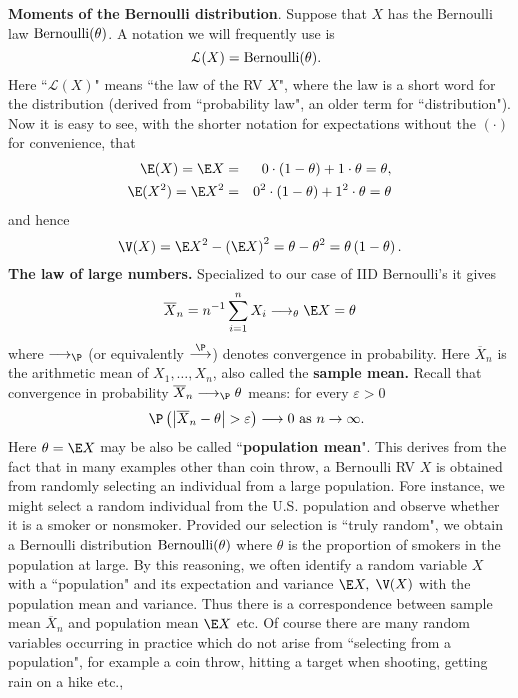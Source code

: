 \textbf{Moments of the Bernoulli distribution}. Suppose that $X$ has the
Bernoulli law $\mbox{{\rm Bernoulli}}(\theta)$. A notation we will frequently use is 
\begin{equation*}
\mathcal{L}(X)=\mbox{{\rm Bernoulli}}(\theta)\text{. }
\end{equation*}%
Here ``$\mathcal{L}(X)$" means ``the law of the RV $X$", where the law is
a short word for the distribution (derived from ``probability law", an older
term for ``distribution"). Now it is easy to see, with the shorter notation for expectations without the $(\cdot)$ for convenience, that 
\begin{eqnarray*}
\E (X) = \E X &=&0\cdot \left( 1-\theta\right) +1\cdot \theta=\theta, \\
\E (X^2) = \E X^{2} &=&0^{2}\cdot \left( 1-\theta\right) +1^{2}\cdot \theta=\theta
\end{eqnarray*}%
and hence 
\begin{equation*}
\V(X)=\E X^{2}-\left( \E X\right) ^{2}=\theta-\theta^{2}=\theta\left( 1-\theta\right) .
\end{equation*}%
\textbf{The law of large numbers. }Specialized to our case of IID
Bernoulli's it gives 
\begin{equation*}
\overline{X}_{n}=n^{-1}\sum_{i=1}^{n}X_{i}\longrightarrow _{\theta}\E X=\theta
\end{equation*}%
where $\longrightarrow_{\P}$ (or equivalently $\overset{\P}{\longrightarrow}$) denotes convergence in probability. Here $\overline{X%
}_{n}$ is the arithmetic mean of $X_{1},\ldots ,X_{n}$, also called the 
\textbf{sample mean.} Recall that convergence in probability $\overline{X}%
_{n}\longrightarrow_{\P} \theta$ means: for every $\varepsilon >0$ 
\begin{equation*}
\P \left( \left\vert \overline{X}_{n}-\theta\right\vert >\varepsilon \right)
\longrightarrow 0\text{ as }n\rightarrow \infty \text{. }
\end{equation*}%
Here $\theta=\E X$ may be also be called ``\textbf{population mean}". This derives
from the fact that in many examples other than coin throw, a Bernoulli RV $X$ 
is obtained from randomly selecting an individual from a large
population. Fore instance, we might select a random individual from the U.S.
population and observe whether it is a smoker or nonsmoker. Provided our
selection is ``truly random", we obtain a Bernoulli distribution $\mbox{{\rm Bernoulli}}(\theta)$ 
where $\theta$ is the proportion of smokers in the population at large. By
this reasoning, we often identify a random variable $X$ with a ``population"
and its expectation and variance $\E X,$ $\V(X)$ with the population
mean and variance. Thus there is a correspondence between sample mean $\overline{X%
}_{n}$ and population mean $\E X$ etc. Of course there are many random
variables occurring in practice which do not arise from ``selecting from a
population", for example a coin throw, hitting a target when shooting,
getting rain on a hike etc., \bigskip \bigskip

